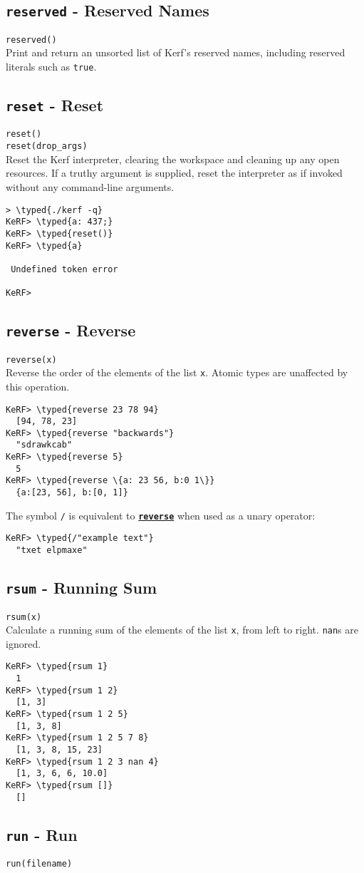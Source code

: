 \documentclass{article}
\newcommand{\typed}[1]{\textcolor{TealBlue}{#1}}
\newcommand{\primdefu}[3]{\subsection{\texttt{#1} - #2}\label{prim:#3}}
\newcommand{\primu}[2]{\hyperref[prim:#2]{\textbf{\texttt{#1}}}}
\newcommand{\primdef}[2]{\primdefu{#1}{#2}{#1}}
\newcommand{\prim}[1]{\primu{#1}{#1}}
\begin{document}
\primdef{reserved}{Reserved Names}
\texttt{reserved()}\\

Print and return an unsorted list of Kerf's reserved names, including reserved literals such as \texttt{true}.

\primdef{reset}{Reset}
\texttt{reset()}\\
\texttt{reset(drop\_args)}\\

Reset the Kerf interpreter, clearing the workspace and cleaning up any open resources. If a truthy argument is supplied, reset the interpreter as if invoked without any command-line arguments.
\begin{Verbatim}
> \typed{./kerf -q}
KeRF> \typed{a: 437;}
KeRF> \typed{reset()}
KeRF> \typed{a}

 Undefined token error

KeRF>
\end{Verbatim}

\pagebreak
\primdef{reverse}{Reverse}
\texttt{reverse(x)}\\

Reverse the order of the elements of the list \texttt{x}. Atomic types are unaffected by this operation.
\begin{Verbatim}
KeRF> \typed{reverse 23 78 94}
  [94, 78, 23]
KeRF> \typed{reverse "backwards"}
  "sdrawkcab"
KeRF> \typed{reverse 5}
  5
KeRF> \typed{reverse \{a: 23 56, b:0 1\}}
  {a:[23, 56], b:[0, 1]}
\end{Verbatim}

The symbol \texttt{/} is equivalent to \prim{reverse} when used as a unary operator:
\begin{Verbatim}
KeRF> \typed{/"example text"}
  "txet elpmaxe"
\end{Verbatim}

\primdef{rsum}{Running Sum}
\texttt{rsum(x)}\\

Calculate a running sum of the elements of the list \texttt{x}, from left to right. \texttt{nan}s are ignored.
\begin{Verbatim}
KeRF> \typed{rsum 1}
  1
KeRF> \typed{rsum 1 2}
  [1, 3]
KeRF> \typed{rsum 1 2 5}
  [1, 3, 8]
KeRF> \typed{rsum 1 2 5 7 8}
  [1, 3, 8, 15, 23]
KeRF> \typed{rsum 1 2 3 nan 4}
  [1, 3, 6, 6, 10.0]
KeRF> \typed{rsum []}
  []
\end{Verbatim}

\subsection{\texttt{run} - Run}
\texttt{run(filename)}\\
\end{document}
